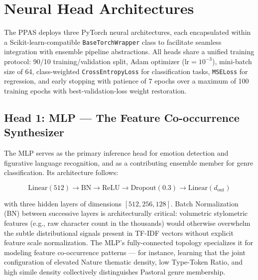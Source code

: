 \documentclass[conference]{IEEEtran}
\begin{document}
\section{Neural Head Architectures}
\label{sec:heads}

The PPAS deploys three PyTorch neural architectures, each encapsulated
within a Scikit-learn-compatible \texttt{BaseTorchWrapper} class to
facilitate seamless integration with ensemble pipeline abstractions. All
heads share a unified training protocol: 90/10 training/validation split,
Adam optimizer ($\text{lr} = 10^{-3}$), mini-batch size of 64,
class-weighted \texttt{CrossEntropyLoss} for classification tasks,
\texttt{MSELoss} for regression, and early stopping with patience of 7
epochs over a maximum of 100 training epochs with best-validation-loss
weight restoration.

\subsection{Head 1: MLP --- The Feature Co-occurrence Synthesizer}

The MLP serves as the primary inference head for emotion detection and
figurative language recognition, and as a contributing ensemble member
for genre classification. Its architecture follows:

\vspace{-0.5em}
\begin{strip}
\vspace{-1em}
\centering
\begin{equation}
\mathrm{Linear}(512)
\rightarrow \mathrm{BN}
\rightarrow \mathrm{ReLU}
\rightarrow \mathrm{Dropout}(0.3)
\rightarrow \mathrm{Linear}(d_{\text{out}})
\end{equation}
\vspace{-1em}
\end{strip}
\vspace{-0.5em}

with three hidden layers of dimensions $[512, 256, 128]$. Batch
Normalization (BN) between successive layers is architecturally critical:
volumetric stylometric features (e.g., raw character count in the
thousands) would otherwise overwhelm the subtle distributional signals
present in TF-IDF vectors without explicit feature scale normalization.
The MLP's fully-connected topology specializes it for modeling feature
co-occurrence patterns --- for instance, learning that the joint
configuration of elevated Nature thematic density, low Type-Token Ratio,
and high simile density collectively distinguishes Pastoral genre
membership.
\end{document}
